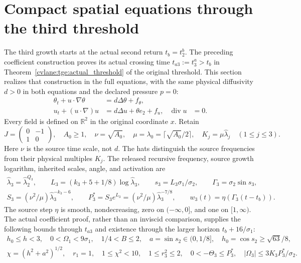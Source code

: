 \section{Compact spatial equations through the third threshold}
\label{cvlane:tgs:section}

The third growth starts at the actual second return $t_b=t_2^b$.
The preceding coefficient construction proves its actual crossing time
$t_{a3}:=t_3^a>t_b$ in Theorem~\ref{cvlane:tge:actual_threshold} of the
original threshold. This section realizes that
construction in the full equations, with the same physical diffusivity
$d>0$ in both equations and the declared pressure $p=0$:
\[
\begin{aligned}
 \theta_t+u\cdot\nabla\theta&=d\Delta\theta+f_\theta,\\
 u_t+(u\cdot\nabla)u&=d\Delta u+\theta e_2+f_u,
 &\operatorname{div}u&=0.
\end{aligned}
\]
Every field is defined on $\mathbb R^2$ in the original coordinate $x$.
Retain
\[
 J=\begin{pmatrix}0&-1\\1&0\end{pmatrix},\quad
 A_0\geq1,\quad\nu=\sqrt{A_0},\quad
 \mu=\lambda_0=\lceil\sqrt{A_0}/2\rceil,\quad
 K_j=\mu\widehat\lambda_j\quad(1\leq j\leq3).
\]
Here $\nu$ is the source time scale, not $d$. The hats distinguish
the source frequencies from their physical multiples $K_j$.
The released recursive frequency, source growth logarithm, inherited
scales, angle, and activation are
\begin{equation}\label{cvlane:tgs:scales}
 \begin{gathered}
 \widehat\lambda_3=\widehat\lambda_2^{Q_3},\qquad
 L_3=(k_3+5+1/8)\log\widehat\lambda_3,\qquad
 s_3=L_3\sigma_1/\sigma_2,\qquad\Gamma_3=\sigma_2\sin s_3,\\
 S_3=(\nu^2/\mu)\widehat\lambda_3^{-k_3-6},\qquad
 P_3^*=S_3e^{L_3}=(\nu^2/\mu)\widehat\lambda_3^{-7/8},\qquad
 w_3(t)=\eta(\Gamma_3(t-t_b)).
 \end{gathered}
\end{equation}
The source step $\eta$ is smooth, nondecreasing, zero on
$(-\infty,0]$, and one on $[1,\infty)$.
The actual coefficient proof, rather than an inviscid comparison,
supplies the following bounds through $t_{a3}$ and existence through
the larger horizon $t_b+16/\sigma_1$:
\begin{equation}\label{cvlane:tgs:actualbounds}
 \begin{gathered}
 h_0\leq h<3,\quad 0<\Omega_1<9\sigma_1,\quad
 1/4<B\leq2,\quad a=\sin s_2\in(0,1/8],\quad
 h_0=\cos s_2\geq\sqrt{63}/8,\\
 \chi=(h^2+a^2)^{1/2},\quad r_1=1,\quad
 1\leq\chi^2<10,\quad 1\leq r_3^2\leq2,\quad
 0< -\Theta_3\leq P_3^*,\quad
 |\Omega_3|\leq3K_3P_3^*/\sigma_2.
 \end{gathered}
\end{equation}
